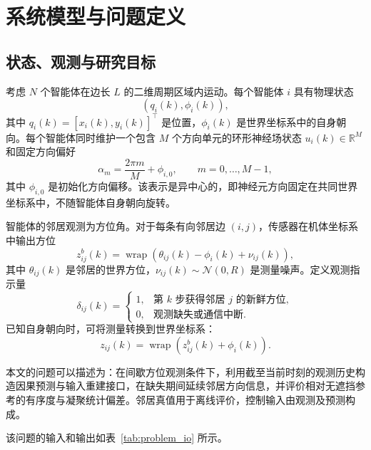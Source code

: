 \documentclass[UTF8,fontset=windows,11pt]{ctexart}
\begin{document}
\section{系统模型与问题定义}\label{sec:system_model}

\subsection{状态、观测与研究目标}\label{sec:observation_model}

考虑 $N$ 个智能体在边长 $L$ 的二维周期区域内运动。每个智能体 $i$ 具有物理状态
\begin{equation}
 (q_i(k),\phi_i(k)),
\end{equation}
其中 $q_i(k)=[x_i(k),y_i(k)]^\top$ 是位置，$\phi_i(k)$ 是世界坐标系中的自身朝向。每个智能体同时维护一个包含 $M$ 个方向单元的环形神经场状态 $u_i(k)\in\mathbb R^M$ 和固定方向偏好
\begin{equation}
 \alpha_m=\frac{2\pi m}{M}+\phi_{i,0},\qquad m=0,\ldots,M-1,
\end{equation}
其中 $\phi_{i,0}$ 是初始化方向偏移。该表示是异中心的，即神经元方向固定在共同世界坐标系中，不随智能体自身朝向旋转。

智能体的邻居观测为方位角。对于每条有向邻居边 $(i,j)$，传感器在机体坐标系中输出方位
\begin{equation}
 z^b_{ij}(k)=
 \operatorname{wrap}\left(\theta_{ij}(k)-\phi_i(k)+\nu_{ij}(k)\right),
\end{equation}
其中 $\theta_{ij}(k)$ 是邻居的世界方位，$\nu_{ij}(k)\sim\mathcal N(0,R)$ 是测量噪声。定义观测指示量
\begin{equation}
 \delta_{ij}(k)=
 \begin{cases}
 1, & \text{第 $k$ 步获得邻居 $j$ 的新鲜方位},\\
 0, & \text{观测缺失或通信中断}.
 \end{cases}
\end{equation}
已知自身朝向时，可将测量转换到世界坐标系：
\begin{equation}
 z_{ij}(k)=\operatorname{wrap}(z^b_{ij}(k)+\phi_i(k)).
\end{equation}

本文的问题可以描述为：在间歇方位观测条件下，利用截至当前时刻的观测历史构造因果预测与输入重建接口，在缺失期间延续邻居方向信息，并评价相对无遮挡参考的有序度与凝聚统计偏差。邻居真值用于离线评价，控制输入由观测及预测构成。

该问题的输入和输出如表~\ref{tab:problem_io} 所示。
\end{document}
